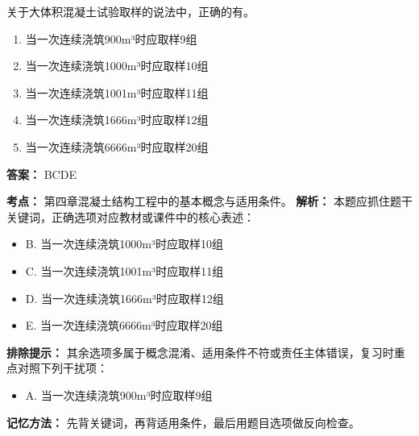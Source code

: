 \documentclass[UTF8,fontset=fandol,11pt]{ctexart}
\begin{document}
\vspace{0.2em}

\begin{quizbox}[title={第 88 题}]
关于大体积混凝土试验取样的说法中，正确的有。\\
\begin{enumerate}[label=\Alph*.]
\item 当一次连续浇筑900m³时应取样9组
\item 当一次连续浇筑1000m³时应取样10组
\item 当一次连续浇筑1001m³时应取样11组
\item 当一次连续浇筑1666m³时应取样12组
\item 当一次连续浇筑6666m³时应取样20组
\end{enumerate}
\textbf{答案：} BCDE
\vspace{0.25em}
\begin{answerbox}[title={考点解析}]
\textbf{考点：} 第四章混凝土结构工程中的基本概念与适用条件。
\textbf{解析：} 本题应抓住题干关键词，正确选项对应教材或课件中的核心表述：
\begin{itemize}
\item B. 当一次连续浇筑1000m³时应取样10组
\item C. 当一次连续浇筑1001m³时应取样11组
\item D. 当一次连续浇筑1666m³时应取样12组
\item E. 当一次连续浇筑6666m³时应取样20组
\end{itemize}
\textbf{排除提示：} 其余选项多属于概念混淆、适用条件不符或责任主体错误，复习时重点对照下列干扰项：
\begin{itemize}
\item A. 当一次连续浇筑900m³时应取样9组
\end{itemize}
\textbf{记忆方法：} 先背关键词，再背适用条件，最后用题目选项做反向检查。
\end{answerbox}
\end{quizbox}

\vspace{0.2em}
\end{document}
